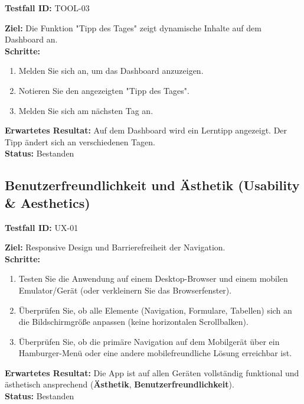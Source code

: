\documentclass[11pt, a4paper]{article}
\newenvironment{testcase}[1]{%
    \par\vspace{1em}\noindent\begin{minipage}{\linewidth}
    \textbf{Testfall ID:} #1 \\
    \vspace{0.2em}
}{\end{minipage}\par\vspace{1em}}
\begin{document}
\begin{testcase}{TOOL-03}
    \textbf{Ziel:} Die Funktion "Tipp des Tages" zeigt dynamische Inhalte auf dem Dashboard an.\\
    \textbf{Schritte:}
    \begin{enumerate}[label=\arabic*.]
        \item Melden Sie sich an, um das Dashboard anzuzeigen.
        \item Notieren Sie den angezeigten "Tipp des Tages".
        \item Melden Sie sich am nächsten Tag an.
    \end{enumerate}
    \textbf{Erwartetes Resultat:} Auf dem Dashboard wird ein Lerntipp angezeigt. Der Tipp ändert sich an verschiedenen Tagen.\\
    \vspace{0.5em}\textbf{Status:} \textcolor{passcolor}{Bestanden}
\end{testcase}

\subsection{Benutzerfreundlichkeit und Ästhetik (Usability \& Aesthetics)}

\begin{testcase}{UX-01}
    \textbf{Ziel:} Responsive Design und Barrierefreiheit der Navigation.\\
    \textbf{Schritte:}
    \begin{enumerate}[label=\arabic*.]
        \item Testen Sie die Anwendung auf einem Desktop-Browser und einem mobilen Emulator/Gerät (oder verkleinern Sie das Browserfenster).
        \item Überprüfen Sie, ob alle Elemente (Navigation, Formulare, Tabellen) sich an die Bildschirmgröße anpassen (keine horizontalen Scrollbalken).
        \item Überprüfen Sie, ob die primäre Navigation auf dem Mobilgerät über ein Hamburger-Menü oder eine andere mobilefreundliche Lösung erreichbar ist.
    \end{enumerate}
    \textbf{Erwartetes Resultat:} Die App ist auf allen Geräten vollständig funktional und ästhetisch ansprechend (\textbf{Ästhetik}, \textbf{Benutzerfreundlichkeit}).\\
    \vspace{0.5em}\textbf{Status:} \textcolor{passcolor}{Bestanden}
\end{testcase}
\end{document}
